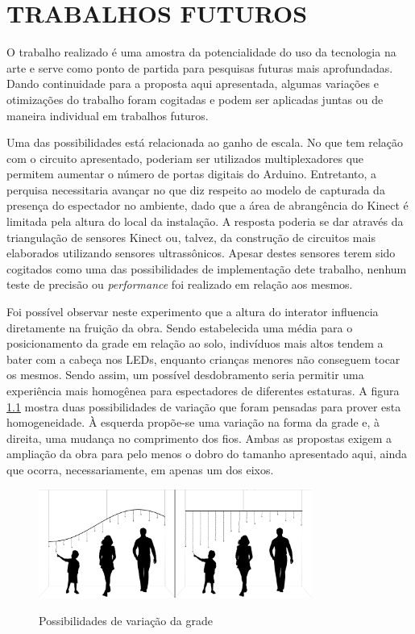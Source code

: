 \chapter{TRABALHOS FUTUROS}

O trabalho realizado é uma amostra da potencialidade do uso da tecnologia na arte e serve como ponto de partida para pesquisas futuras mais aprofundadas. Dando continuidade para a proposta aqui apresentada, algumas variações e otimizações do trabalho foram cogitadas e podem ser aplicadas juntas ou de maneira individual em trabalhos futuros.

Uma das possibilidades está relacionada ao ganho de escala. No que tem relação com o circuito apresentado, poderiam ser utilizados multiplexadores que permitem aumentar o número de portas digitais do Arduino. Entretanto, a perquisa necessitaria avançar no que diz respeito ao modelo de capturada da presença do espectador no ambiente, dado que a área de abrangência do Kinect é limitada pela altura do local da instalação. A resposta poderia se dar através da triangulação de sensores Kinect ou, talvez, da construção de circuitos mais elaborados utilizando sensores ultrassônicos. Apesar destes sensores terem sido cogitados como uma das possibilidades de implementação dete trabalho, nenhum teste de precisão ou \textit{performance} foi realizado em relação aos mesmos.

Foi possível observar neste experimento que a altura do interator influencia diretamente na fruição da obra. Sendo estabelecida uma média para o posicionamento da grade em relação ao solo, indivíduos mais altos tendem a bater com a cabeça nos LEDs, enquanto crianças menores não conseguem tocar os mesmos. Sendo assim, um possível desdobramento seria permitir uma experiência mais homogênea para espectadores de diferentes estaturas. A figura \ref{fig:malha_futuro} mostra duas possibilidades de variação que foram pensadas para prover esta homogeneidade. À esquerda propõe-se uma variação na forma da grade e, à direita, uma mudança no comprimento dos fios. Ambas as propostas exigem a ampliação da obra para pelo menos o dobro do tamanho apresentado aqui, ainda que ocorra, necessariamente, em apenas um dos eixos. 

\begin{figure}[H]
    \centering
    \caption{Possibilidades de variação da grade}
	\vspace*{0,2cm}
    \includegraphics[width=0.8\textwidth]{./04-figuras/malha_futuro}
    \label{fig:malha_futuro}
\end{figure}
\vspace*{-0,9cm}
{\raggedright {}}\\


